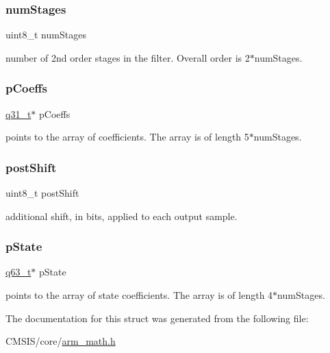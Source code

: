 \subsubsection{\texorpdfstring{numStages}{numStages}}
{\footnotesize\ttfamily uint8\+\_\+t num\+Stages}

number of 2nd order stages in the filter. Overall order is 2$\ast$num\+Stages. \mbox{\label{structarm__biquad__cas__df1__32x64__ins__q31_a68888e36167d81cb7836db10367a1682}} 
\subsubsection{\texorpdfstring{pCoeffs}{pCoeffs}}
{\footnotesize\ttfamily \mbox{\hyperlink{arm__math_8h_adc89a3547f5324b7b3b95adec3806bc0}{q31\+\_\+t}}$\ast$ p\+Coeffs}

points to the array of coefficients. The array is of length 5$\ast$num\+Stages. \mbox{\label{structarm__biquad__cas__df1__32x64__ins__q31_a74050e9f36542bd56f4052381a82ae8f}} 
\subsubsection{\texorpdfstring{postShift}{postShift}}
{\footnotesize\ttfamily uint8\+\_\+t post\+Shift}

additional shift, in bits, applied to each output sample. \mbox{\label{structarm__biquad__cas__df1__32x64__ins__q31_adefeb77301cc04e4d7d22f323029d588}} 
\subsubsection{\texorpdfstring{pState}{pState}}
{\footnotesize\ttfamily \mbox{\hyperlink{arm__math_8h_a5aea1cb12fc02d9d44c8abf217eaa5c6}{q63\+\_\+t}}$\ast$ p\+State}

points to the array of state coefficients. The array is of length 4$\ast$num\+Stages. 

The documentation for this struct was generated from the following file\+:\begin{DoxyCompactItemize}
\item 
C\+M\+S\+I\+S/core/\mbox{\hyperlink{arm__math_8h}{arm\+\_\+math.\+h}}\end{DoxyCompactItemize}
